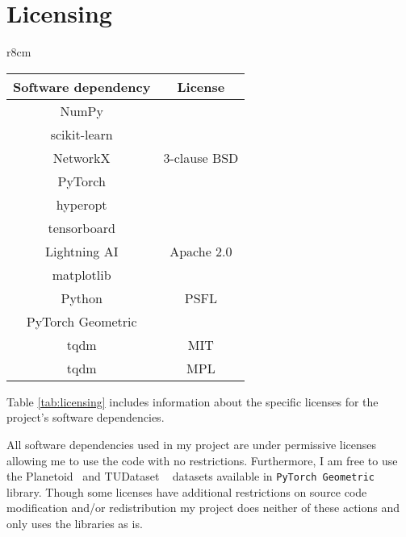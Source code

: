 \section{Licensing}
\begin{wraptable}{r}{8cm}
    \centering
    \begin{tabular}{cc}
        \multicolumn{1}{c}{\textbf{Software dependency}} &
        \multicolumn{1}{c}{\textbf{License}} \\ 
        \midrule
        NumPy & \multirow{5}{*}{3-clause BSD} \\
        scikit-learn & \\
        NetworkX & \\
        PyTorch & \\
        hyperopt \footnotemark[9] & \\
        \rowcolor{gray!20} tensorboard & \\
        \rowcolor{gray!20} Lightning AI &  \multirow{-2}{*}{Apache 2.0}\\
        matplotlib & \\
        Python & \multirow{-2}{*}{PSFL}\\
        \rowcolor{gray!20}
        PyTorch Geometric & \\
        \rowcolor{gray!20}
        tqdm & \multirow{-2}{*}{MIT} \\
        tqdm & MPL\footnotemark[10] \\
    \end{tabular}
    \caption{Project dependency licenses}
    \label{tab:licensing}
\end{wraptable}


Table \ref{tab:licensing} includes information about the specific licenses for the project's software dependencies.

All software dependencies used in my project are under permissive licenses allowing me to use the code with no restrictions.
Furthermore, I am free to use the Planetoid~\cite{planetoid} and TUDataset ~\cite{Morris+2020} datasets available in \texttt{PyTorch Geometric}~\cite{Fey/Lenssen/2019} library.
Though some licenses have additional restrictions on source code modification and/or redistribution my project does neither of these actions and only uses the libraries as is.

